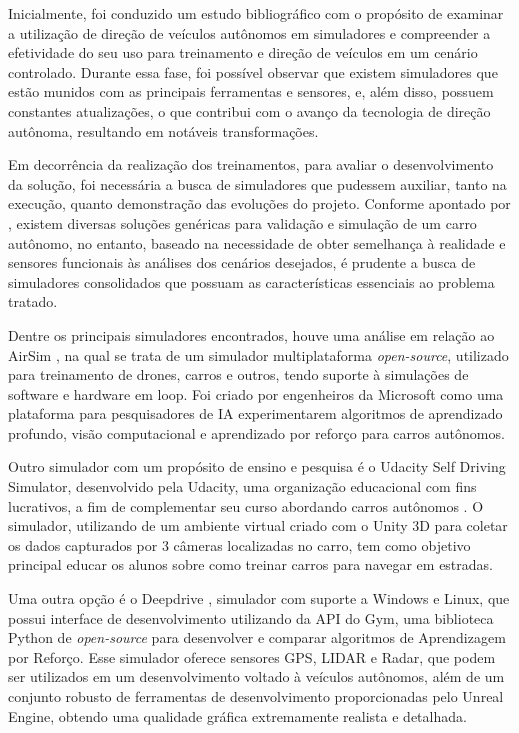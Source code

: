 \documentclass[a4paper,12pt,Times]{article}
\begin{document}
Inicialmente, foi conduzido um estudo bibliográfico com o propósito de examinar a utilização de direção de veículos autônomos em simuladores e compreender a efetividade do seu uso para treinamento e direção de veículos em um cenário controlado. Durante essa fase, foi possível observar que existem simuladores que estão munidos com as principais ferramentas e sensores, e, além disso, possuem constantes atualizações, o que contribui com o avanço da tecnologia de direção autônoma, resultando em notáveis transformações.

Em decorrência da realização dos treinamentos, para avaliar o desenvolvimento da solução, foi necessária a busca de simuladores que pudessem auxiliar, tanto na execução, quanto demonstração das evoluções do projeto. Conforme apontado por , existem diversas soluções genéricas para validação e simulação de um carro autônomo, no entanto, baseado na necessidade de obter semelhança à realidade e sensores funcionais às análises dos cenários desejados, é prudente a busca de simuladores consolidados que possuam as características essenciais ao problema tratado.

Dentre os principais simuladores encontrados, houve uma análise em relação ao AirSim \cite{airsim2017fsr}, na qual se trata de um simulador multiplataforma \textit{open-source}, utilizado para treinamento de drones, carros e outros, tendo suporte à simulações de software e hardware em loop. Foi criado por engenheiros da Microsoft como uma plataforma para pesquisadores de IA experimentarem algoritmos de aprendizado profundo, visão computacional e aprendizado por reforço para carros autônomos.

Outro simulador com um propósito de ensino e pesquisa é o Udacity Self Driving Simulator, desenvolvido pela Udacity, uma organização educacional com fins lucrativos, a fim de complementar seu curso abordando carros autônomos \cite{udacity-sim}. O simulador, utilizando de um ambiente virtual criado com o Unity 3D para coletar os dados capturados por 3 câmeras localizadas no carro, tem como objetivo principal educar os alunos sobre como treinar carros para navegar em estradas. 

Uma outra opção é o Deepdrive \cite{deepdrive}, simulador com suporte a Windows e Linux, que possui interface de desenvolvimento utilizando da API do Gym, uma biblioteca Python de \textit{open-source} para desenvolver e comparar algoritmos de Aprendizagem por Reforço. Esse simulador oferece sensores GPS, LIDAR e Radar, que podem ser utilizados em um desenvolvimento voltado à veículos autônomos, além de um conjunto robusto de ferramentas de desenvolvimento proporcionadas pelo Unreal Engine, obtendo uma qualidade gráfica extremamente realista e detalhada.
\end{document}
